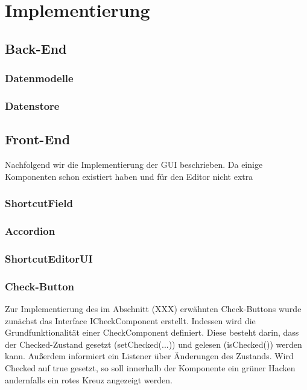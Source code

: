 \section{Implementierung}

\subsection{Back-End}

\subsubsection{Datenmodelle}

\subsubsection{Datenstore}

\subsection{Front-End}

Nachfolgend wir die Implementierung der GUI beschrieben. Da einige Komponenten schon existiert haben und für den Editor nicht extra

\subsubsection{ShortcutField}

\subsubsection{Accordion}

\subsubsection{ShortcutEditorUI}

\newpage

\subsubsection{Check-Button}

Zur Implementierung des im Abschnitt (XXX) erwähnten Check-Buttons wurde zunächst das Interface ICheckComponent erstellt. Indessen wird die Grundfunktionalität einer CheckComponent definiert. Diese besteht darin, dass der Checked-Zustand gesetzt (setChecked(...)) und gelesen (isChecked()) werden kann. Außerdem informiert ein Listener über Änderungen des Zustands. Wird Checked auf true gesetzt, so soll innerhalb der Komponente ein grüner Hacken andernfalls ein rotes Kreuz angezeigt werden. 

